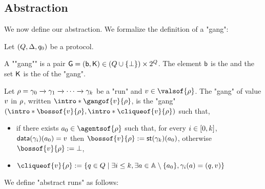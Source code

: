 \subsection{Abstraction}

We now define our abstraction. We formalize the definition of a "gang":

\begin{definition}
	Let $(Q,\Delta, q_0)$ be a protocol.
	
	A ""gang"" is a pair $\mathsf{G} = (\mathsf{b}, \mathsf{K}) \in (Q \cup \{\bot\}) \times 2^{Q}$. 
	The element $\mathsf{b}$ is the  and the set $\mathsf{K}$ is the  of the "gang". 
	
	Let $\rho = \gamma_0 \xrightarrow{} \gamma_1 \xrightarrow{} \cdots \xrightarrow{} \gamma_k$ be a "run" and $\aval \in \valsof{\run}$. The "gang" of value $v$ in $\rho$, written $\intro*\gangof{\aval}{\run}$, is the "gang" $(\intro*\bossof{\aval}{\run}, \intro*\cliqueof{\aval}{\run})$ such that, 
	\begin{itemize}
		\item if there exists $a_0 \in \agentsof{\run}$ such that, 
		for every 
		$i \in [0,k]$, 
		$\mathsf{data}(\gamma_i)(a_0) = v$ then $\bossof{\aval}{\run} := \st{\config_k}(a_0)$, otherwise $\bossof{\aval}{\run} := \noboss$, 
		\item  $\cliqueof{\aval}{\run} := \set{q \in Q \mid \exists i \leq k, \exists a \in \agents\setminus \set{a_0}, \config_i(a) = (q,\aval)}$
	\end{itemize}
\end{definition} 


We define "abstract runs" as follows:

